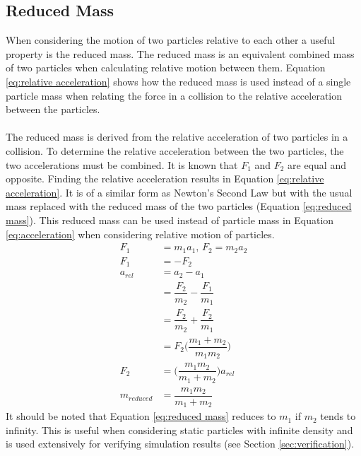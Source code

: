 \documentclass[a4paper,11pt,titlepage]{report}
\begin{document}
\subsection{Reduced Mass}
When considering the motion of two particles relative to each other a useful property is the reduced mass. The reduced mass is an equivalent combined mass of two particles when calculating relative motion between them. Equation \ref{eq:relative acceleration} shows how the reduced mass is used instead of a single particle mass when relating the force in a collision to the relative acceleration between the particles.
\\\\The reduced mass is derived from the relative acceleration of two particles in a collision. To determine the relative acceleration between the two particles, the two accelerations must be combined. It is known that $F_1$ and $F_2$ are equal and opposite. Finding the relative acceleration results in Equation \ref{eq:relative acceleration}. It is of a similar form as Newton's Second Law but with the usual mass replaced with the reduced mass of the two particles (Equation \ref{eq:reduced mass}). This reduced mass can be used instead of particle mass in Equation \ref{eq:acceleration} when considering relative motion of particles.
\begin{align}
F_1 &= m_1 a_1 \nonumber \text{, } F_2 = m_2 a_2 \nonumber
\\F_1 &= -F_2 \nonumber
\\a_{rel} &= a_2 - a_1 \nonumber
\\&= \dfrac{F_2}{m_2} - \dfrac{F_1}{m_1} \nonumber
\\&= \dfrac{F_2}{m_2} + \dfrac{F_2}{m_1} \nonumber
\\&= F_2 \Big(\dfrac{m_1 + m_2}{m_1 m_2}\Big) \nonumber
\\F_2 &= \Big(\dfrac{m_1 m_2}{m_1 + m_2}\Big) a_{rel} \label{eq:relative acceleration}
\\m_{reduced} &= \dfrac{m_1 m_2}{m_1 + m_2} \label{eq:reduced mass}
\end{align}
It should be noted that Equation \ref{eq:reduced mass} reduces to $m_1$ if $m_2$ tends to infinity. This is useful when considering static particles with infinite density and is used extensively for verifying simulation results (see Section \ref{sec:verification}).
\end{document}
